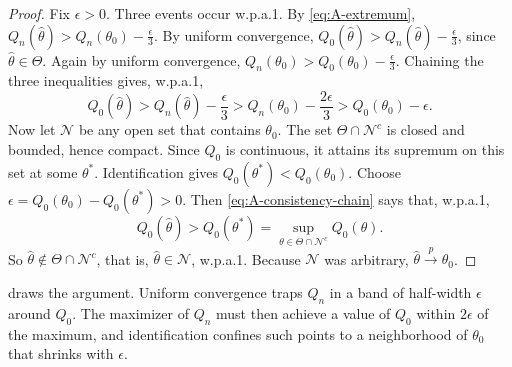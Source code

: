 \begin{proof}
Fix $\epsilon > 0$. Three events occur w.p.a.1. By \eqref{eq:A-extremum},
$Q_n(\hat\theta) > Q_n(\theta_0) - \frac{\epsilon}{3}$. By uniform convergence,
$Q_0(\hat\theta) > Q_n(\hat\theta) - \frac{\epsilon}{3}$, since $\hat\theta \in \Theta$. Again by uniform convergence,
$Q_n(\theta_0) > Q_0(\theta_0) - \frac{\epsilon}{3}$. Chaining the three inequalities gives, w.p.a.1,
\begin{equation}\label{eq:A-consistency-chain}
  Q_0(\hat\theta) > Q_n(\hat\theta) - \frac{\epsilon}{3} > Q_n(\theta_0) - \frac{2\epsilon}{3} > Q_0(\theta_0) - \epsilon.
\end{equation}
Now let $\mathcal{N}$ be any open set that contains $\theta_0$. The set $\Theta \cap \mathcal{N}^c$ is closed and bounded,
hence compact. Since $Q_0$ is continuous, it attains its supremum on this set at some $\theta^*$. Identification gives
$Q_0(\theta^*) < Q_0(\theta_0)$. Choose $\epsilon = Q_0(\theta_0) - Q_0(\theta^*) > 0$. Then
\eqref{eq:A-consistency-chain} says that, w.p.a.1,
\begin{equation*}
  Q_0(\hat\theta) > Q_0(\theta^*) = \sup_{\theta \in \Theta \cap \mathcal{N}^c}Q_0(\theta).
\end{equation*}
So $\hat\theta \notin \Theta \cap \mathcal{N}^c$, that is, $\hat\theta \in \mathcal{N}$, w.p.a.1. Because $\mathcal{N}$ was
arbitrary, $\hat\theta \xrightarrow{p} \theta_0$.
\end{proof}

 draws the argument. Uniform convergence traps $Q_n$ in a band of half-width $\epsilon$ around
$Q_0$. The maximizer of $Q_n$ must then achieve a value of $Q_0$ within $2\epsilon$ of the maximum, and identification
confines such points to a neighborhood of $\theta_0$ that shrinks with $\epsilon$.

